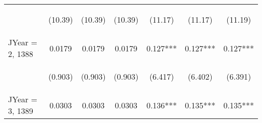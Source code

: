 \documentclass[]{article}
\begin{document}
\begin{center}
\begin{tabular}{lcccccc}
        \vspace{4pt}     & \begin{footnotesize}(10.39)\end{footnotesize}  & \begin{footnotesize}(10.39)\end{footnotesize}  & \begin{footnotesize}(10.39)\end{footnotesize}  & \begin{footnotesize}(11.17)\end{footnotesize}   & \begin{footnotesize}(11.17)\end{footnotesize}  & \begin{footnotesize}(11.19)\end{footnotesize}  \\
        JYear = 2, 1388  & 0.0179                                         & 0.0179                                         & 0.0179                                         & 0.127***                                        & 0.127***                                       & 0.127***                                       \\
        \vspace{4pt}     & \begin{footnotesize}(0.903)\end{footnotesize}  & \begin{footnotesize}(0.903)\end{footnotesize}  & \begin{footnotesize}(0.903)\end{footnotesize}  & \begin{footnotesize}(6.417)\end{footnotesize}   & \begin{footnotesize}(6.402)\end{footnotesize}  & \begin{footnotesize}(6.391)\end{footnotesize}  \\
        JYear = 3, 1389  & 0.0303                                         & 0.0303                                         & 0.0303                                         & 0.136***                                        & 0.135***                                       & 0.135***                                       \\

\end{tabular}
\end{center}
\end{document}
